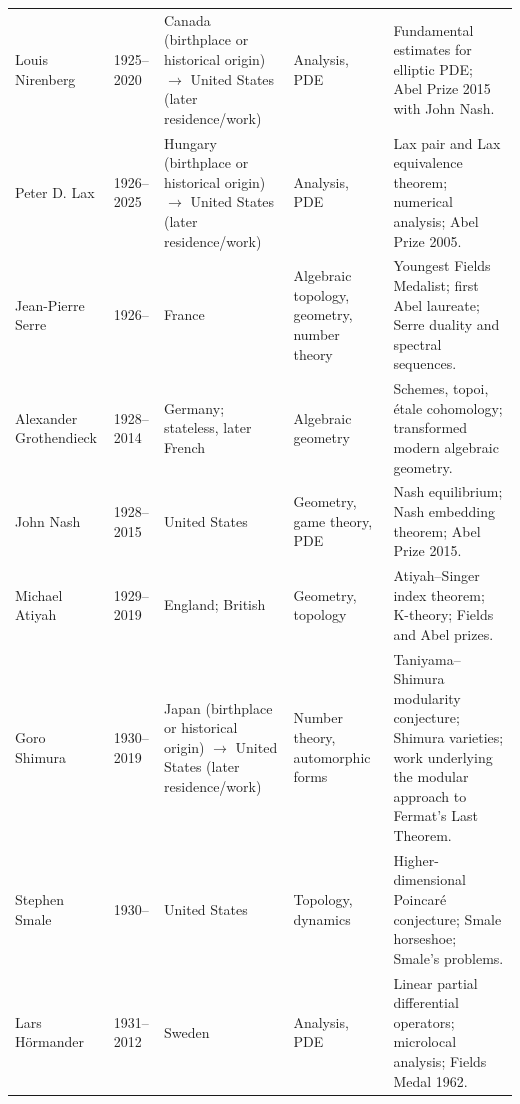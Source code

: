 {\begin{longtable}{@{}L{0.145\textwidth}L{0.09\textwidth}L{0.225\textwidth}L{0.14\textwidth}L{0.30\textwidth}@{}}
        Louis Nirenberg
        & 1925--2020
        & Canada (birthplace or historical origin) \(\to\) United States (later residence/work)
        & Analysis, PDE
        & Fundamental estimates for elliptic PDE; Abel Prize 2015 with John
          Nash. \\

        Peter D. Lax
        & 1926--2025
        & Hungary (birthplace or historical origin) \(\to\) United States (later residence/work)
        & Analysis, PDE
        & Lax pair and Lax equivalence theorem; numerical analysis; Abel Prize
          2005. \\

        Jean-Pierre Serre
        & 1926--
        & France
        & Algebraic topology, geometry, number theory
        & Youngest Fields Medalist; first Abel laureate; Serre duality and
          spectral sequences. \\

        Alexander Grothendieck
        & 1928--2014
        & Germany; stateless, later French
        & Algebraic geometry
        & Schemes, topoi, étale cohomology; transformed modern algebraic
          geometry. \\

        John Nash
        & 1928--2015
        & United States
        & Geometry, game theory, PDE
        & Nash equilibrium; Nash embedding theorem; Abel Prize 2015. \\

        Michael Atiyah
        & 1929--2019
        & England; British
        & Geometry, topology
        & Atiyah--Singer index theorem; K-theory; Fields and Abel prizes. \\

        Goro Shimura
        & 1930--2019
        & Japan (birthplace or historical origin) \(\to\) United States (later residence/work)
        & Number theory, automorphic forms
        & Taniyama--Shimura modularity conjecture; Shimura varieties; work
          underlying the modular approach to Fermat's Last Theorem. \\

        Stephen Smale
        & 1930--
        & United States
        & Topology, dynamics
        & Higher-dimensional Poincaré conjecture; Smale horseshoe; Smale's
          problems. \\

        Lars Hörmander
        & 1931--2012
        & Sweden
        & Analysis, PDE
        & Linear partial differential operators; microlocal analysis; Fields
          Medal 1962. \\


\end{longtable}}
